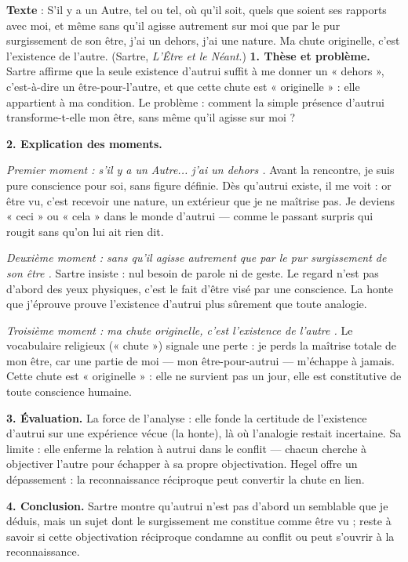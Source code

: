\documentclass[11pt]{article}
\begin{document}
\begin{exoresolu}
\textbf{Texte} : \guillemotleft S'il y a un Autre, tel ou tel, où qu'il soit, quels que soient ses rapports avec moi, et même sans qu'il agisse autrement sur moi que par le pur surgissement de son être, j'ai un dehors, j'ai une nature. Ma chute originelle, c'est l'existence de l'autre. \guillemotright (Sartre, \emph{L'Être et le Néant}.)
\tcblower
\textbf{1. Thèse et problème.} Sartre affirme que la seule existence d'autrui suffit à me donner un « dehors », c'est-à-dire un être-pour-l'autre, et que cette chute est « originelle » : elle appartient à ma condition. Le problème : comment la simple présence d'autrui transforme-t-elle mon être, sans même qu'il agisse sur moi ?

\textbf{2. Explication des moments.}

\emph{Premier moment : \guillemotleft s'il y a un Autre... j'ai un dehors \guillemotright.} Avant la rencontre, je suis pure conscience pour soi, sans figure définie. Dès qu'autrui existe, il me voit : or être vu, c'est recevoir une nature, un extérieur que je ne maîtrise pas. Je deviens « ceci » ou « cela » dans le monde d'autrui — comme le passant surpris qui rougit sans qu'on lui ait rien dit.

\emph{Deuxième moment : \guillemotleft sans qu'il agisse autrement que par le pur surgissement de son être \guillemotright.} Sartre insiste : nul besoin de parole ni de geste. Le regard n'est pas d'abord des yeux physiques, c'est le fait d'être visé par une conscience. La honte que j'éprouve prouve l'existence d'autrui plus sûrement que toute analogie.

\emph{Troisième moment : \guillemotleft ma chute originelle, c'est l'existence de l'autre \guillemotright.} Le vocabulaire religieux (« chute ») signale une perte : je perds la maîtrise totale de mon être, car une partie de moi — mon être-pour-autrui — m'échappe à jamais. Cette chute est « originelle » : elle ne survient pas un jour, elle est constitutive de toute conscience humaine.

\textbf{3. Évaluation.} La force de l'analyse : elle fonde la certitude de l'existence d'autrui sur une expérience vécue (la honte), là où l'analogie restait incertaine. Sa limite : elle enferme la relation à autrui dans le conflit — chacun cherche à objectiver l'autre pour échapper à sa propre objectivation. Hegel offre un dépassement : la reconnaissance réciproque peut convertir la chute en lien.

\textbf{4. Conclusion.} Sartre montre qu'autrui n'est pas d'abord un semblable que je déduis, mais un sujet dont le surgissement me constitue comme être vu ; reste à savoir si cette objectivation réciproque condamne au conflit ou peut s'ouvrir à la reconnaissance.
\end{exoresolu}
\end{document}
